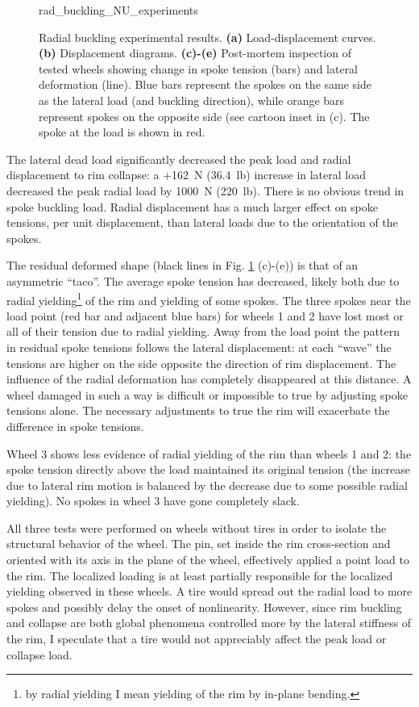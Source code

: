 \documentclass[\rootdir/thesis.tex]{subfiles}
\begin{document}
\begin{figure}
\centering
{rad_buckling_NU_experiments}
\caption[Radial buckling experimental results]{Radial buckling experimental results. \textbf{(a)} Load-displacement curves. \textbf{(b)} Displacement diagrams. \textbf{(c)-(e)} Post-mortem inspection of tested wheels showing change in spoke tension (bars) and lateral deformation (line). Blue bars represent the spokes on the same side as the lateral load (and buckling direction), while orange bars represent spokes on the opposite side (see cartoon inset in (c). The spoke at the load is shown in red.}
\label{fig:rad_buckling_NU_experiments}
\end{figure}

The lateral dead load significantly decreased the peak load and radial displacement to rim collapse: a +\SI{162}{N} (\SI{36.4}{lb}) increase in lateral load decreased the peak radial load by \SI{1000}{N} (\SI{220}{lb}). There is no obvious trend in spoke buckling load. Radial displacement has a much larger effect on spoke tensions, per unit displacement, than lateral loads due to the orientation of the spokes.

The residual deformed shape (black lines in Fig. \ref{fig:rad_buckling_NU_experiments} (c)-(e)) is that of an asymmetric ``taco''. The average spoke tension has decreased, likely both due to radial yielding\footnote{by radial yielding I mean yielding of the rim by in-plane bending.} of the rim and yielding of some spokes. The three spokes near the load point (red bar and adjacent blue bars) for wheels 1 and 2 have lost most or all of their tension due to radial yielding. Away from the load point the pattern in residual spoke tensions follows the lateral displacement: at each ``wave'' the tensions are higher on the side opposite the direction of rim displacement. The influence of the radial deformation has completely disappeared at this distance. A wheel damaged in such a way is difficult or impossible to true by adjusting spoke tensions alone. The necessary adjustments to true the rim will exacerbate the difference in spoke tensions.

Wheel 3 shows less evidence of radial yielding of the rim than wheels 1 and 2: the spoke tension directly above the load maintained its original tension (the increase due to lateral rim motion is balanced by the decrease due to some possible radial yielding). No spokes in wheel 3 have gone completely slack.

All three tests were performed on wheels without tires in order to isolate the structural behavior of the wheel. The pin, set inside the rim cross-section and oriented with its axis in the plane of the wheel, effectively applied a point load to the rim. The localized loading is at least partially responsible for the localized yielding observed in these wheels. A tire would spread out the radial load to more spokes and possibly delay the onset of nonlinearity. However, since rim buckling and collapse are both global phenomena controlled more by the lateral stiffness of the rim, I speculate that a tire would not appreciably affect the peak load or collapse load.
\end{document}
